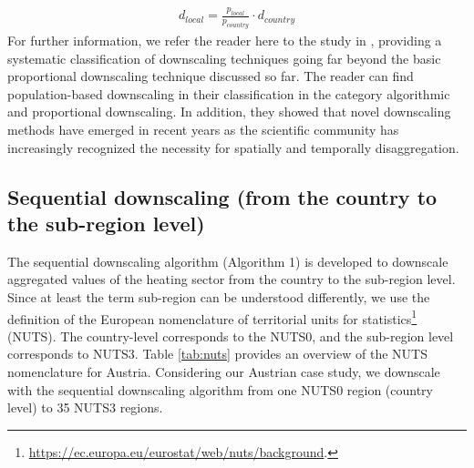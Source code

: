 \begin{align}\label{eq:1}
d_{local}=\frac{p_{local}}{p_{country}} \cdot d_{country}
\end{align}
For further information, we refer the reader here to the study in \cite{van2010downscaling}, providing a systematic classification of downscaling techniques going far beyond the basic proportional downscaling technique discussed so far. The reader can find population-based downscaling in their classification in the category algorithmic and proportional downscaling. In addition, they showed that novel downscaling methods have emerged in recent years as the scientific community has increasingly recognized the necessity for spatially and temporally disaggregation.

\subsection{Sequential downscaling (from the country to the sub-region level)}\label{alg1}
The sequential downscaling algorithm (Algorithm 1) is developed to downscale aggregated values of the heating sector from the country to the sub-region level. Since at least the term sub-region can be understood differently, we use the definition of the European nomenclature of territorial units for statistics\footnote{\url{https://ec.europa.eu/eurostat/web/nuts/background}.} (NUTS). The country-level corresponds to the NUTS0, and the sub-region level corresponds to NUTS3. Table \ref{tab:nuts} provides an overview of the NUTS nomenclature for Austria. Considering our Austrian case study, we downscale with the sequential downscaling algorithm from one NUTS0 region (country level) to \SI{35}{} NUTS3 regions.\newline

